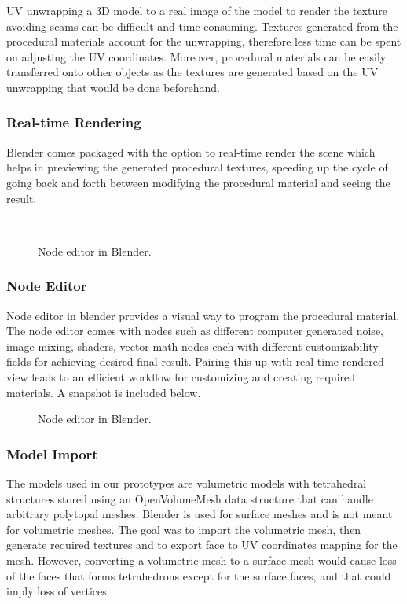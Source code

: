 UV unwrapping a 3D model to a real image of the model to render the texture avoiding seams can be difficult and time consuming. Textures generated from the procedural materials account for the unwrapping, therefore less time can be spent on adjusting the UV coordinates. Moreover, procedural materials can be easily transferred onto other objects as the textures are generated based on the UV unwrapping that would be done beforehand.

\subsubsection{Real-time Rendering}
Blender comes packaged with the option to real-time render the scene which helps in previewing the generated procedural textures, speeding up the cycle of going back and forth between modifying the procedural material and seeing the result.

\begin{figure}
  \centering%
  \setlength{\fboxsep}{0pt}%
  \setlength{\fboxrule}{0.1pt}%
  \\[2ex]
  \caption{Node editor in Blender.}\label{fig:procedural_textures}
\end{figure}

\subsubsection{Node Editor}
Node editor in blender provides a visual way to program the procedural material. The node editor comes with nodes such as different computer generated noise, image mixing, shaders, vector math nodes each with different customizability fields for achieving desired final result. Pairing this up with real-time rendered view leads to an efficient workflow for customizing and creating required materials. A snapshot is included below.

\begin{figure}
  \centering%
  \setlength{\fboxsep}{0pt}%
  \setlength{\fboxrule}{0.1pt}%
  \caption{Node editor in Blender.}\label{fig:blender}
\end{figure}

\subsubsection{Model Import}
The models used in our prototypes are volumetric models with tetrahedral structures stored using an OpenVolumeMesh data structure that can handle arbitrary polytopal meshes. Blender is used for surface meshes and is not meant for volumetric meshes. The goal was to import the volumetric mesh, then generate required textures and to export face to UV coordinates mapping for the mesh. However, converting a volumetric mesh to a surface mesh would cause loss of the faces that forms tetrahedrons except for the surface faces, and that could imply loss of vertices.

